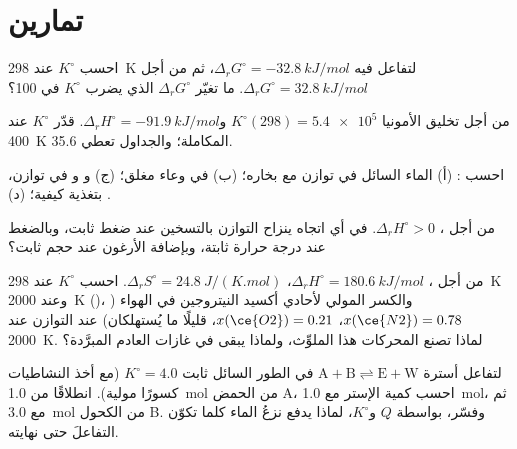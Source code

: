 \section{تمارين}

\begin{exercise}[$\star$]\label{exo:b2:equilibrium-shifts:1}
احسب $K^\circ$ عند \qty{298}{K} لتفاعل فيه $\Delta_r G^\circ =
\qty{-32.8}{kJ/mol}$، ثم من أجل $\Delta_r G^\circ = \qty{+32.8}{kJ/mol}$.
ما تغيّر $\Delta_r G^\circ$ الذي يضرب $K^\circ$ في 100؟
\end{exercise}

\begin{exercise}[$\star$]\label{exo:b2:equilibrium-shifts:2}
من أجل تخليق الأمونيا $K^\circ(298) = \num{5.4e5}$ و$\Delta_r H^\circ =
\qty{-91.9}{kJ/mol}$. قدّر $K^\circ$ عند \qty{400}{K} 
المكاملة؛ والجداول تعطي 35.6.
\end{exercise}

\begin{exercise}[$\star$]\label{exo:b2:equilibrium-shifts:3}
احسب : (أ) الماء السائل في توازن مع بخاره؛
(ب)  في وعاء مغلق؛ (ج) 
و و في توازن، بتغذية كيفية؛ (د) .
\end{exercise}

\begin{exercise}[$\star$]\label{exo:b2:equilibrium-shifts:4}
من أجل ، $\Delta_r H^\circ > 0$. في أي اتجاه
ينزاح التوازن بالتسخين عند ضغط ثابت، وبالضغط عند درجة حرارة
ثابتة، وبإضافة الأرغون عند حجم ثابت؟
\end{exercise}

\begin{exercise}[$\star\star$]\label{exo:b2:equilibrium-shifts:5}
من أجل ، $\Delta_r H^\circ = \qty{180.6}{kJ/mol}$،
$\Delta_r S^\circ = \qty{24.8}{J/(K.mol)}$. احسب $K^\circ$ عند \qty{298}{K}
وعند \qty{2000}{K} ()، والكسر المولي لأحادي أكسيد النيتروجين
 في الهواء ($x(\ce{N2}) = 0.78$، $x(\ce{O2}) = 0.21$، قليلًا ما يُستهلكان) عند
التوازن عند \qty{2000}{K}. لماذا تصنع المحركات هذا الملوِّث، ولماذا
يبقى في غازات العادم المبرَّدة؟
\end{exercise}

\begin{exercise}[$\star\star$]\label{exo:b2:equilibrium-shifts:6}
لتفاعل أسترة $\mathrm{A + B \rightleftharpoons E + W}$ في الطور السائل
ثابت $K^\circ = 4.0$ (مع أخذ النشاطيات كسورًا مولية). انطلاقًا من
\qty{1.0}{mol} من الحمض A، احسب كمية الإستر مع \qty{1.0}{mol}، ثم مع
\qty{3.0}{mol} من الكحول B. وفسّر، بواسطة $Q$ و$K^\circ$، لماذا يدفع نزعُ
الماء كلما تكوّن التفاعلَ حتى نهايته.
\end{exercise}

